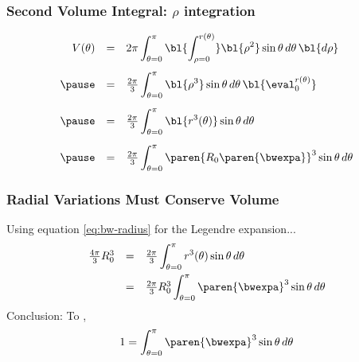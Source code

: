 \begin{frame}\frametitle{Second Volume Integral: $\rho$ integration}
\begin{equation}
	\begin{array}{rcl}
	V(\theta) &=& 2\pi \displaystyle \int_{\theta=0}^{\pi} \bl{\int_{\rho = 0}^{r(\theta)}}  \bl{\rho^{2}} \sin{\theta} \, d\theta\,  \bl{d\rho} \\[15pt]
	\pause
		&=& \frac{2\pi}{3} \displaystyle \int_{\theta=0}^{\pi} \bl{\rho^{3}} \sin{\theta} \,d\theta \, \bl{\eval_{0}^{r(\theta)}}  \\[15pt]
	\pause
		&=& \frac{2\pi}{3} \displaystyle \int_{\theta=0}^{\pi} \bl{r^{3}(\theta)}\sin{\theta} \,d\theta   \\[15pt]
	\pause
		&=& \frac{2\pi}{3} \displaystyle \int_{\theta=0}^{\pi} \paren{R_{0}\paren{\bwexpa}}^{3} \sin{\theta} \, d\theta \\
	\end{array}
\end{equation}
\end{frame}

\begin{frame}\frametitle{Radial Variations Must Conserve Volume}
%
Using equation \ref{eq:bw-radius} for the Legendre expansion...
\begin{equation}
	\begin{array}{rcl}
		\frac{4\pi}{3} R_{0}^{3} &=&  \frac{2\pi}{3} \displaystyle \int_{\theta=0}^{\pi} r^{3}(\theta) \sin{\theta} \, d\theta \\[10pt]
		&=& \frac{2\pi}{3} R_{0}^{3} \displaystyle \int_{\theta=0}^{\pi} \paren{\bwexpa}^{3} \sin{\theta} \, d\theta \\
	\end{array}
\end{equation}
Conclusion: To , 
\begin{equation}
	1 = \int_{\theta=0}^{\pi} \paren{\bwexpa}^{3} \sin{\theta} \, d\theta
\label{eq:conserve}
\end{equation}
\end{frame}

